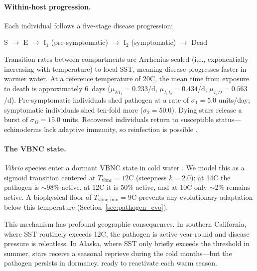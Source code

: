 \paragraph{Within-host progression.}
Each individual follows a five-stage disease progression:
\begin{center}
S $\to$ E $\to$ I$_1$ (pre-symptomatic) $\to$ I$_2$ (symptomatic)
  $\to$ Dead
\end{center}
Transition rates between compartments are Arrhenius-scaled (i.e., exponentially increasing with temperature) to local SST,
meaning disease progresses faster in warmer water.  At a reference
temperature of 20\textdegree C, the mean time from exposure to death is
approximately 6~days ($\mu_{EI_1} = 0.233$/d, $\mu_{I_1 I_2} = 0.434$/d,
$\mu_{I_2 D} = 0.563$/d).  Pre-symptomatic individuals shed pathogen at a
rate of $\sigma_1 = 5.0$ units/day; symptomatic individuals shed ten-fold
more ($\sigma_2 = 50.0$).  Dying stars release a burst of $\sigma_D = 15.0$
units.  Recovered individuals return to susceptible status---echinoderms
lack adaptive immunity, so reinfection is possible \citep{prentice2025}.

\paragraph{The VBNC state.}
\textit{Vibrio} species enter a dormant VBNC state in cold water
\citep{liu2019}.  We model this as a sigmoid transition centered at
$T_\mathrm{vbnc} = 12$\textdegree C (steepness $k = 2.0$): at
14\textdegree C the pathogen is ${\sim}$98\% active, at 12\textdegree C
it is 50\% active, and at 10\textdegree C only ${\sim}$2\% remains active.
A biophysical floor of $T_\mathrm{vbnc,min} = 9$\textdegree C prevents any
evolutionary adaptation below this temperature (Section~\ref{sec:pathogen_evo}).

This mechanism has profound geographic consequences.  In southern California,
where SST routinely exceeds 12\textdegree C, the pathogen is active
year-round and disease pressure is relentless.  In Alaska, where SST only
briefly exceeds the threshold in summer, stars receive a seasonal reprieve
during the cold months---but the pathogen persists in dormancy, ready to
reactivate each warm season.


